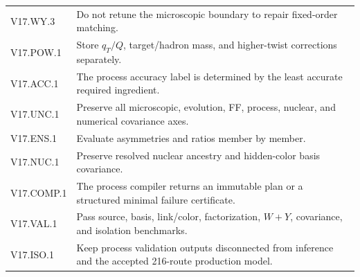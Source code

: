 \documentclass[11pt]{article}
\begin{document}
\begin{longtable}{L{0.18\textwidth}L{0.74\textwidth}}
V17.WY.3 & Do not retune the microscopic boundary to repair fixed-order matching.\\
V17.POW.1 & Store \(q_T/Q\), target/hadron mass, and higher-twist corrections separately.\\
V17.ACC.1 & The process accuracy label is determined by the least accurate required ingredient.\\
V17.UNC.1 & Preserve all microscopic, evolution, FF, process, nuclear, and numerical covariance axes.\\
V17.ENS.1 & Evaluate asymmetries and ratios member by member.\\
V17.NUC.1 & Preserve resolved nuclear ancestry and hidden-color basis covariance.\\
V17.COMP.1 & The process compiler returns an immutable plan or a structured minimal failure certificate.\\
V17.VAL.1 & Pass source, basis, link/color, factorization, \(W+Y\), covariance, and isolation benchmarks.\\
V17.ISO.1 & Keep process validation outputs disconnected from inference and the accepted 216-route production model.\\
\bottomrule
\end{longtable}
\normalsize
\end{document}

